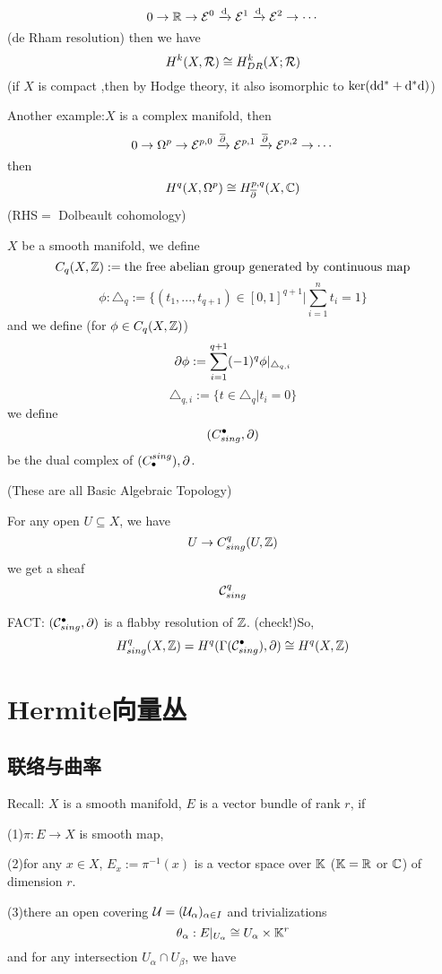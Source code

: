 
$$0\to\mathbb{R}\to\mathcal{E}^0\xrightarrow{\mathrm{d}}\mathcal{E}^1\xrightarrow{\mathrm{d}}\mathcal{E}^2\to\cdots$$
(de Rham resolution) then we have
$$H^k(X,\mathcal{R})\cong H_{DR}^k(X;\mathcal{R})$$
(if $X$ is compact ,then by Hodge theory, it also isomorphic to $\ker(\mathrm{d}\mathrm{d}^*+\mathrm{d}^*\mathrm{d})$)

Another example:$X$ is a complex manifold, then
$$0\to\Omega^p\to\mathcal{E}^{p,0}\xrightarrow{\overline{\partial}}\mathcal{E}^{p,1}\xrightarrow{\overline{\partial}}\mathcal{E}^{p,2}\to\cdots$$
then
$$H^{q}(X,\Omega^p)\cong H_{\overline{\partial}}^{p,q}(X,\mathbb{C})$$
(RHS$=$ Dolbeault cohomology)


$X$ be a smooth manifold, we define
$$C_q(X,\mathbb{Z}):=\text{the free abelian group generated by continuous map}$$
$$\phi:\triangle_q:=\{(t_1,...,t_{q+1})\in[0,1]^{q+1}|\sum_{i=1}^nt_i=1\}$$
and we define (for $\phi\in C_q(X,\mathbb{Z})$)
$$\partial\phi:=\sum_{i=1}^{q+1}(-1)^q\phi|_{\triangle_{q,i}}$$
$$\triangle_{q,i}:=\{t\in\triangle_q|t_i=0\}$$
we define
$$(C_{sing}^{\bullet},\partial)$$
be the dual complex of $(C^{sing}_{\bullet}),\partial$.

(These are all Basic Algebraic Topology)

For any open $U\subseteq X$, we have
$$U\to C_{sing}^q(U,\mathbb{Z})$$
we get a sheaf
$$\mathcal{C}_{sing}^q$$

FACT: $(\mathcal{C}_{sing}^{\bullet},\partial)$ is a flabby resolution of $\mathbb{Z}$. (check!)So,
$$H^q_{sing}(X,\mathbb{Z})= H^q(\Gamma(\mathcal{C}_{sing}^{\bullet}),\partial)
\cong H^q(X,\mathbb{Z})$$


\chapter{Hermite向量丛}
\section{联络与曲率}

Recall: $X$ is a smooth manifold, $E$ is a vector bundle of rank $r$, if

(1)$\pi:E\to X$ is smooth map,

(2)for any $x\in X$, $E_x:=\pi^{-1}(x)$ is a vector space over $\mathbb{K}$
($\mathbb{K}=\mathbb{R}$ or $\mathbb{C}$) of dimension $r$.

(3)there an open covering $\mathcal{U}=(\mathcal{U}_{\alpha})_{\alpha\in I}$ and trivializations
$$\theta_\alpha: E|_{U_{\alpha}}\cong U_{\alpha}\times \mathbb{K}^r$$
and for any intersection $U_{\alpha}\cap U_{\beta}$, we have


